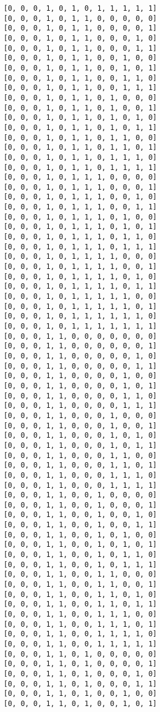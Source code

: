 \documentclass[11pt]{article}
\begin{document}
\begin{Verbatim}[commandchars=\\\{\}]
[0, 0, 0, 1, 0, 1, 0, 1, 1, 1, 1, 1]
[0, 0, 0, 1, 0, 1, 1, 0, 0, 0, 0, 0]
[0, 0, 0, 1, 0, 1, 1, 0, 0, 0, 0, 1]
[0, 0, 0, 1, 0, 1, 1, 0, 0, 0, 1, 0]
[0, 0, 0, 1, 0, 1, 1, 0, 0, 0, 1, 1]
[0, 0, 0, 1, 0, 1, 1, 0, 0, 1, 0, 0]
[0, 0, 0, 1, 0, 1, 1, 0, 0, 1, 0, 1]
[0, 0, 0, 1, 0, 1, 1, 0, 0, 1, 1, 0]
[0, 0, 0, 1, 0, 1, 1, 0, 0, 1, 1, 1]
[0, 0, 0, 1, 0, 1, 1, 0, 1, 0, 0, 0]
[0, 0, 0, 1, 0, 1, 1, 0, 1, 0, 0, 1]
[0, 0, 0, 1, 0, 1, 1, 0, 1, 0, 1, 0]
[0, 0, 0, 1, 0, 1, 1, 0, 1, 0, 1, 1]
[0, 0, 0, 1, 0, 1, 1, 0, 1, 1, 0, 0]
[0, 0, 0, 1, 0, 1, 1, 0, 1, 1, 0, 1]
[0, 0, 0, 1, 0, 1, 1, 0, 1, 1, 1, 0]
[0, 0, 0, 1, 0, 1, 1, 0, 1, 1, 1, 1]
[0, 0, 0, 1, 0, 1, 1, 1, 0, 0, 0, 0]
[0, 0, 0, 1, 0, 1, 1, 1, 0, 0, 0, 1]
[0, 0, 0, 1, 0, 1, 1, 1, 0, 0, 1, 0]
[0, 0, 0, 1, 0, 1, 1, 1, 0, 0, 1, 1]
[0, 0, 0, 1, 0, 1, 1, 1, 0, 1, 0, 0]
[0, 0, 0, 1, 0, 1, 1, 1, 0, 1, 0, 1]
[0, 0, 0, 1, 0, 1, 1, 1, 0, 1, 1, 0]
[0, 0, 0, 1, 0, 1, 1, 1, 0, 1, 1, 1]
[0, 0, 0, 1, 0, 1, 1, 1, 1, 0, 0, 0]
[0, 0, 0, 1, 0, 1, 1, 1, 1, 0, 0, 1]
[0, 0, 0, 1, 0, 1, 1, 1, 1, 0, 1, 0]
[0, 0, 0, 1, 0, 1, 1, 1, 1, 0, 1, 1]
[0, 0, 0, 1, 0, 1, 1, 1, 1, 1, 0, 0]
[0, 0, 0, 1, 0, 1, 1, 1, 1, 1, 0, 1]
[0, 0, 0, 1, 0, 1, 1, 1, 1, 1, 1, 0]
[0, 0, 0, 1, 0, 1, 1, 1, 1, 1, 1, 1]
[0, 0, 0, 1, 1, 0, 0, 0, 0, 0, 0, 0]
[0, 0, 0, 1, 1, 0, 0, 0, 0, 0, 0, 1]
[0, 0, 0, 1, 1, 0, 0, 0, 0, 0, 1, 0]
[0, 0, 0, 1, 1, 0, 0, 0, 0, 0, 1, 1]
[0, 0, 0, 1, 1, 0, 0, 0, 0, 1, 0, 0]
[0, 0, 0, 1, 1, 0, 0, 0, 0, 1, 0, 1]
[0, 0, 0, 1, 1, 0, 0, 0, 0, 1, 1, 0]
[0, 0, 0, 1, 1, 0, 0, 0, 0, 1, 1, 1]
[0, 0, 0, 1, 1, 0, 0, 0, 1, 0, 0, 0]
[0, 0, 0, 1, 1, 0, 0, 0, 1, 0, 0, 1]
[0, 0, 0, 1, 1, 0, 0, 0, 1, 0, 1, 0]
[0, 0, 0, 1, 1, 0, 0, 0, 1, 0, 1, 1]
[0, 0, 0, 1, 1, 0, 0, 0, 1, 1, 0, 0]
[0, 0, 0, 1, 1, 0, 0, 0, 1, 1, 0, 1]
[0, 0, 0, 1, 1, 0, 0, 0, 1, 1, 1, 0]
[0, 0, 0, 1, 1, 0, 0, 0, 1, 1, 1, 1]
[0, 0, 0, 1, 1, 0, 0, 1, 0, 0, 0, 0]
[0, 0, 0, 1, 1, 0, 0, 1, 0, 0, 0, 1]
[0, 0, 0, 1, 1, 0, 0, 1, 0, 0, 1, 0]
[0, 0, 0, 1, 1, 0, 0, 1, 0, 0, 1, 1]
[0, 0, 0, 1, 1, 0, 0, 1, 0, 1, 0, 0]
[0, 0, 0, 1, 1, 0, 0, 1, 0, 1, 0, 1]
[0, 0, 0, 1, 1, 0, 0, 1, 0, 1, 1, 0]
[0, 0, 0, 1, 1, 0, 0, 1, 0, 1, 1, 1]
[0, 0, 0, 1, 1, 0, 0, 1, 1, 0, 0, 0]
[0, 0, 0, 1, 1, 0, 0, 1, 1, 0, 0, 1]
[0, 0, 0, 1, 1, 0, 0, 1, 1, 0, 1, 0]
[0, 0, 0, 1, 1, 0, 0, 1, 1, 0, 1, 1]
[0, 0, 0, 1, 1, 0, 0, 1, 1, 1, 0, 0]
[0, 0, 0, 1, 1, 0, 0, 1, 1, 1, 0, 1]
[0, 0, 0, 1, 1, 0, 0, 1, 1, 1, 1, 0]
[0, 0, 0, 1, 1, 0, 0, 1, 1, 1, 1, 1]
[0, 0, 0, 1, 1, 0, 1, 0, 0, 0, 0, 0]
[0, 0, 0, 1, 1, 0, 1, 0, 0, 0, 0, 1]
[0, 0, 0, 1, 1, 0, 1, 0, 0, 0, 1, 0]
[0, 0, 0, 1, 1, 0, 1, 0, 0, 0, 1, 1]
[0, 0, 0, 1, 1, 0, 1, 0, 0, 1, 0, 0]
[0, 0, 0, 1, 1, 0, 1, 0, 0, 1, 0, 1]

\end{Verbatim}
\end{document}
